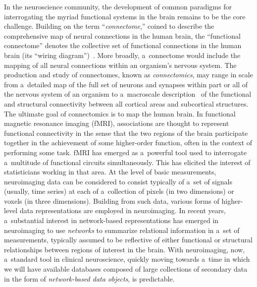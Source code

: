 \begin{multicols}{2}
\noindent
  In the neuroscience community, the development of common paradigms for
interrogating the myriad functional systems in the brain remains to be the core
challenge. Building on the term ``\textit{connectome},'' coined to describe the
comprehensive map of neural connections in the human brain, the ``functional
connectome'' denotes the collective set of functional connections in the human brain
(its ``wiring diagram'')~\cite{62-kl}. More broadly, a~connectome would include the
mapping of all neural connections within an organism's nervous system. The
production and study of connectomes, known as \textit{connectomics}, may range in
scale from a~detailed map of the full set of neurons and synapses within part or all of
the nervous system of an organism to a~macroscale description~\cite{63-kl} of the
functional and structural connectivity between all cortical areas and subcortical
structures. The ultimate goal of connectomics is to map the human brain. In
functional magnetic resonance imaging (fMRI), associations are thought to represent
functional connectivity in the sense that the two regions of the brain participate
together in the achievement of some higher-order function, often in the context of
performing some task. fMRI has emerged as a~powerful tool used to interrogate a~multitude of functional circuits simultaneously. This has elicited the interest of
statisticians working in that area. At the level of basic measurements, neuroimaging
data can be considered to consist typically of a~set of signals (usually, time series) at
each of a~collection of pixels (in two dimensions) or voxels (in three dimensions).
Building from such data, various forms of higher-level data representations are
employed in neuroimaging. In recent years, a~substantial interest in network-based
representations has emerged in neuroimaging to use \textit{networks} to summarize
relational information in a~set of measurements, typically assumed to be reflective of
either functional or structural relationships between regions of interest in the brain.
With neuroimaging, now, a~standard tool in clinical neuroscience, quickly moving
towards a~time in which we will have available databases composed of large
collections of secondary data in the form of \textit{network-based data objects}, is
predictable.


\end{multicols}
